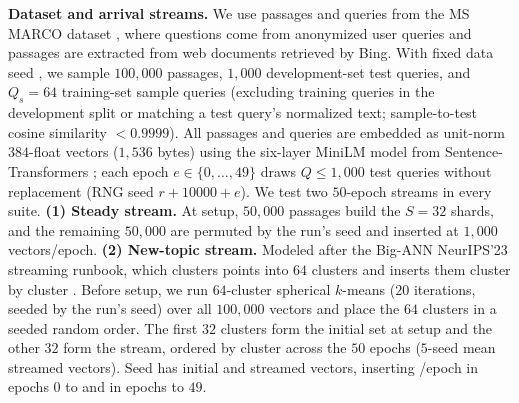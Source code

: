 \textbf{Dataset and arrival streams.} We use passages and queries from the MS MARCO dataset \cite{nguyen2016msmarco}, where questions come from anonymized user queries and passages are extracted from web documents retrieved by Bing. With fixed data seed \RNumDataSeed{}, we sample $100{,}000$ passages, $1{,}000$ development-set test queries, and $Q_s = 64$ training-set sample queries (excluding training queries in the development split or matching a test query's normalized text; sample-to-test cosine similarity $< 0.9999$). All passages and queries are embedded as unit-norm $384$-float vectors ($1{,}536$ bytes) using the six-layer MiniLM model from Sentence-Transformers \cite{reimers2019sbert}; each epoch $e \in \{0, \dots, 49\}$ draws $Q \le 1{,}000$ test queries without replacement (RNG seed $r + 10000 + e$). We test two $50$-epoch streams in every suite. \textbf{(1) Steady stream.} At setup, $50{,}000$ passages build the $S = 32$ shards, and the remaining $50{,}000$ are permuted by the run's seed and inserted at $1{,}000$ vectors/epoch. \textbf{(2) New-topic stream.} Modeled after the Big-ANN NeurIPS'23 streaming runbook, which clusters points into $64$ clusters and inserts them cluster by cluster \cite{simhadri2024bigann}. Before setup, we run $64$-cluster spherical $k$-means ($20$ iterations, seeded by the run's seed) \cite{douze2024faiss} over all $100{,}000$ vectors and place the $64$ clusters in a seeded random order. The first $32$ clusters form the initial set at setup and the other $32$ form the stream, ordered by cluster across the $50$ epochs ($5$-seed mean \RNumNewTopicStreamVecsMean{} streamed vectors). Seed \RNumPilotSeed{} has \RNumNewTopicInitVecsSeedFortyTwo{} initial and \RNumNewTopicStreamVecsSeedFortyTwo{} streamed vectors, inserting \RNumNewTopicEpochVecsHighSeedFortyTwo{}/epoch in epochs $0$ to \RNumNewTopicHighLastEpochSeedFortyTwo{} and \RNumNewTopicEpochVecsLowSeedFortyTwo{} in epochs \RNumNewTopicLowFirstEpochSeedFortyTwo{} to $49$.

